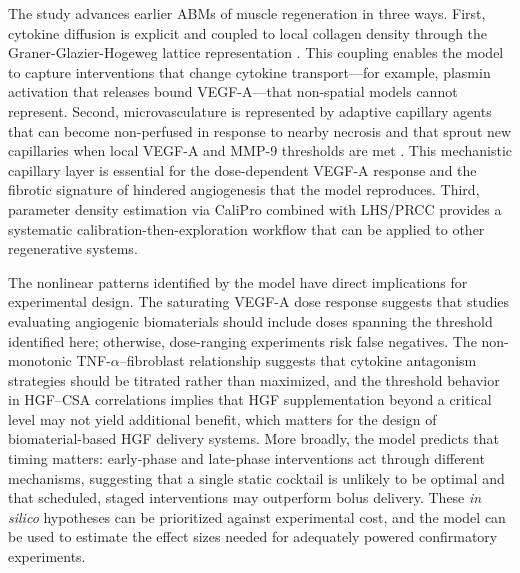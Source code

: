 \documentclass[10pt,letterpaper]{article}
\begin{document}
The study advances earlier ABMs of muscle regeneration \cite{virgilio2015multiscale,martin2017agent} in three ways. First, cytokine diffusion is explicit and coupled to local collagen density through the Graner-Glazier-Hogeweg lattice representation \cite{graner1992simulation,swat2012compucell3d}. This coupling enables the model to capture interventions that change cytokine transport---for example, plasmin activation that releases bound VEGF-A---that non-spatial models cannot represent. Second, microvasculature is represented by adaptive capillary agents that can become non-perfused in response to nearby necrosis and that sprout new capillaries when local VEGF-A and MMP-9 thresholds are met \cite{carmeliet2003angiogenesis}. This mechanistic capillary layer is essential for the dose-dependent VEGF-A response and the fibrotic signature of hindered angiogenesis that the model reproduces. Third, parameter density estimation via CaliPro \cite{joslyn2021calipro} combined with LHS/PRCC \cite{marino2008sensitivity} provides a systematic calibration-then-exploration workflow that can be applied to other regenerative systems.

The nonlinear patterns identified by the model have direct implications for experimental design. The saturating VEGF-A dose response suggests that studies evaluating angiogenic biomaterials should include doses spanning the threshold identified here; otherwise, dose-ranging experiments risk false negatives. The non-monotonic TNF-$\alpha$--fibroblast relationship suggests that cytokine antagonism strategies should be titrated rather than maximized, and the threshold behavior in HGF--CSA correlations implies that HGF supplementation beyond a critical level may not yield additional benefit, which matters for the design of biomaterial-based HGF delivery systems. More broadly, the model predicts that timing matters: early-phase and late-phase interventions act through different mechanisms, suggesting that a single static cocktail is unlikely to be optimal and that scheduled, staged interventions may outperform bolus delivery. These \emph{in silico} hypotheses can be prioritized against experimental cost, and the model can be used to estimate the effect sizes needed for adequately powered confirmatory experiments.
\end{document}
